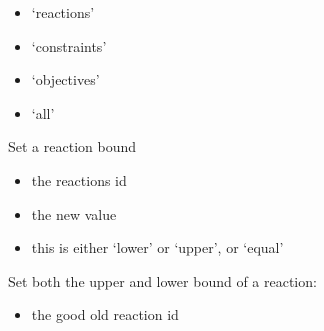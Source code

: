 \documentclass[letterpaper,10pt,english]{sphinxmanual}
\begin{document}
\begin{fulllineitems}
\begin{fulllineitems}
\begin{itemize}
\item {} 
\sphinxAtStartPar
‘reactions’

\item {} 
\sphinxAtStartPar
‘constraints’

\item {} 
\sphinxAtStartPar
‘objectives’

\item {} 
\sphinxAtStartPar
‘all’

\end{itemize}

\end{fulllineitems}


\begin{fulllineitems}
\label{\detokenize{modules_doc:cbmpy.CBModel.Model.setReactionBound}}
\pysigstartsignatures
{}
\pysigstopsignatures
\sphinxAtStartPar
Set a reaction bound
\begin{itemize}
\item {} 
\sphinxAtStartPar
{} the reactions id

\item {} 
\sphinxAtStartPar
{} the new value

\item {} 
\sphinxAtStartPar
{} this is either ‘lower’ or ‘upper’, or ‘equal’

\end{itemize}

\end{fulllineitems}


\begin{fulllineitems}
\label{\detokenize{modules_doc:cbmpy.CBModel.Model.setReactionBounds}}
\pysigstartsignatures
{}
\pysigstopsignatures
\sphinxAtStartPar
Set both the upper and lower bound of a reaction:
\begin{itemize}
\item {} 
\sphinxAtStartPar
{} the good old reaction id


\end{itemize}
\end{fulllineitems}
\end{fulllineitems}
\end{document}
